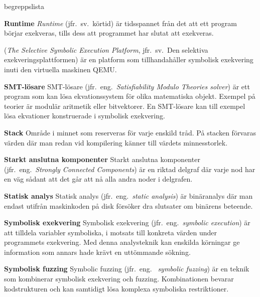 \begin{labeling}{begreppslista}
    \item [\textbf{Runtime}] \emph{Runtime} (jfr.\ sv.\ körtid) är tidsspannet
    från det att ett program börjar exekveras, tills dess att programmet har
    slutat att exekveras.

    \item [\textbf{\stoe}] \stoe (\emph{The Selective Symbolic Execution
        Platform}, jfr.\ sv.\ Den selektiva exekveringsplattformen) är
    en platform som tillhandahåller symbolisk exekvering inuti den virtuella
    maskinen QEMU.\@

    \item [\textbf{SMT-lösare}] SMT-lösare (jfr.\ eng.\ \emph{Satisfiability Modulo
        Theories solver}) är ett program som kan lösa
    ekvationssystem för olika matematiska objekt. Exempel på
    teorier är modulär aritmetik eller bitvektorer. En SMT-lösare
    kan till exempel lösa ekvationer konstruerade i symbolisk
    exekvering.

    \item [\textbf{Stack}] Område i minnet som reserveras för varje
    enskild tråd. På stacken förvaras värden där man redan vid
    kompilering känner till värdets minnesstorlek.

    \item [\textbf{Starkt anslutna komponenter}] Starkt anslutna komponenter
    (jfr.\ eng.\ \emph{Strongly Connected Components}) är en riktad delgraf där
    varje nod har en väg sådant att det går att nå alla andra noder i delgrafen.

    \item [\textbf{Statisk analys}] Statisk analys (jfr.\ eng.\ \emph{static
        analysis}) är binäranalys där man endast utifrån maskinkoden på disk
    försöker dra slutsater om binärens beteende.


    \item [\textbf{Symbolisk exekvering}] Symbolisk exekvering (jfr.\ eng.\
    \emph{symbolic execution}) är att tilldela variabler symboliska, i motsats
    till konkreta värden under programmets exekvering. Med denna analysteknik
    kan enskilda körningar ge information som annars hade krävt en uttömmande
    sökning.

    \item [\textbf{Symbolisk fuzzing}] Symbolic fuzzing (jfr.\ eng.
    \ \emph{symbolic fuzzing}) är en teknik som kombinerar symbolisk
    exekvering och fuzzing. Kombinationen bevarar kodstrukturen och kan
    samtidigt lösa komplexa symboliska restriktioner.


\end{labeling}
